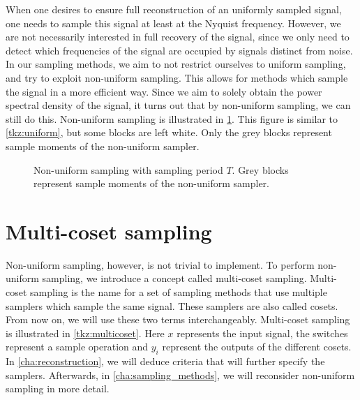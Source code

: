 \documentclass[a4paper, openany, oneside]{memoir}
\begin{document}
When one desires to ensure full reconstruction of an uniformly sampled signal, one needs to sample this signal at least at the Nyquist frequency. However, we are not necessarily interested in full recovery of the signal, since we only need to detect which frequencies of the signal are occupied by signals distinct from noise. In our sampling methods, we aim to not restrict ourselves to uniform sampling, and try to exploit non-uniform sampling. This allows for methods which sample the signal in a more efficient way. Since we aim to solely obtain the power spectral density of the signal, it turns out that by non-uniform sampling, we can still do this. Non-uniform sampling is illustrated in \cref{tkz:nonuniform}. This figure is similar to \cref{tkz:uniform}, but some blocks are left white. Only the grey blocks represent sample moments of the non-uniform sampler.

\begin{figure}[H]
\centering
{}
\caption{Non-uniform sampling with sampling period $T$. Grey blocks represent sample moments of the non-uniform sampler.}\label{tkz:nonuniform}
\end{figure}

\section{Multi-coset sampling}
Non-uniform sampling, however, is not trivial to implement. To perform non-uniform sampling, we introduce a concept called multi-coset sampling. Multi-coset sampling is the name for a set of sampling methods that use multiple samplers which sample the same signal. These samplers are also called cosets. From now on, we will use these two terms interchangeably. Multi-coset sampling is illustrated in \cref{tkz:multicoset}. Here $x$ represents the input signal, the switches represent a sample operation and $y_i$ represent the outputs of the different cosets. In \cref{cha:reconstruction}, we will deduce criteria that will further specify the samplers. Afterwards, in \cref{cha:sampling_methods}, we will reconsider non-uniform sampling in more detail.
\end{document}
